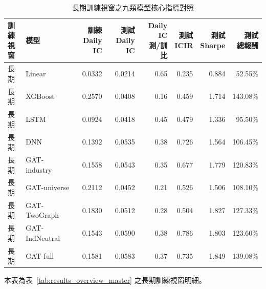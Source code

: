 \begin{table}[H]
\centering
\caption{長期訓練視窗之九類模型核心指標對照}
\label{tab:results_static_long_topology}
\begingroup
\scriptsize
\setlength{\tabcolsep}{4pt}
\renewcommand{\arraystretch}{1.10}
\begin{adjustbox}{max width=\textwidth}
\begin{tabular}{@{}llrrrrrr@{}}
\toprule
\makecell[l]{訓練\\視窗} & 模型 & \makecell[r]{訓練\\Daily IC} & \makecell[r]{測試\\Daily IC} & \makecell[r]{Daily IC\\測/訓比} & \makecell[r]{測試\\ICIR} & \makecell[r]{測試\\Sharpe} & \makecell[r]{測試\\總報酬} \\
\midrule
長期 & Linear & 0.0332 & 0.0214 & 0.65 & 0.235 & 0.884 & 52.55\% \\
長期 & XGBoost & 0.2570 & 0.0408 & 0.16 & 0.459 & 1.714 & 143.08\% \\
長期 & LSTM & 0.0924 & 0.0418 & 0.45 & 0.479 & 1.336 & 95.50\% \\
長期 & DNN & 0.1392 & 0.0535 & 0.38 & 0.726 & 1.564 & 106.45\% \\
\midrule
長期 & GAT-industry & 0.1558 & 0.0543 & 0.35 & 0.677 & 1.779 & 120.83\% \\
長期 & GAT-universe & 0.2112 & 0.0452 & 0.21 & 0.526 & 1.506 & 108.10\% \\
長期 & GAT-TwoGraph & 0.1830 & 0.0512 & 0.28 & 0.504 & 1.827 & 127.33\% \\
\midrule
長期 & GAT-IndNeutral & 0.1543 & 0.0590 & 0.38 & 0.786 & 1.803 & 123.60\% \\
長期 & GAT-full & 0.1581 & 0.0583 & 0.37 & 0.735 & 1.849 & 139.08\% \\
\bottomrule
\end{tabular}
\end{adjustbox}
\smallskip

{\footnotesize 本表為表~\ref{tab:results_overview_master} 之長期訓練視窗明細。}
\endgroup
\end{table}
